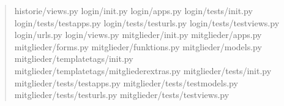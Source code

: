 \documentclass[letterpaper,10pt,english]{sphinxmanual}
\begin{document}
\begin{quote}
\begin{sphinxVerbatim}[commandchars=\\\{\}]
historie/views.py                                                    \PYGZpc{}
login/\PYGZus{}\PYGZus{}init\PYGZus{}\PYGZus{}.py                                                      \PYGZpc{}
login/apps.py                                                          \PYGZpc{}
login/tests/\PYGZus{}\PYGZus{}init\PYGZus{}\PYGZus{}.py                                                \PYGZpc{}
login/tests/test\PYGZus{}apps.py                                               \PYGZpc{}
login/tests/test\PYGZus{}urls.py                                              \PYGZpc{}
login/tests/test\PYGZus{}views.py                                             \PYGZpc{}
login/urls.py                                                          \PYGZpc{}
login/views.py                                                         \PYGZpc{}
mitglieder/\PYGZus{}\PYGZus{}init\PYGZus{}\PYGZus{}.py                                                 \PYGZpc{}
mitglieder/apps.py                                                     \PYGZpc{}
mitglieder/forms.py                                                   \PYGZpc{}
mitglieder/funktions.py                                                \PYGZpc{}
mitglieder/models.py                                                  \PYGZpc{}
mitglieder/templatetags/\PYGZus{}\PYGZus{}init\PYGZus{}\PYGZus{}.py                                    \PYGZpc{}
mitglieder/templatetags/mitglieder\PYGZus{}extras.py                            \PYGZpc{}
mitglieder/tests/\PYGZus{}\PYGZus{}init\PYGZus{}\PYGZus{}.py                                           \PYGZpc{}
mitglieder/tests/test\PYGZus{}apps.py                                          \PYGZpc{}
mitglieder/tests/test\PYGZus{}models.py                                       \PYGZpc{}
mitglieder/tests/test\PYGZus{}urls.py                                         \PYGZpc{}
mitglieder/tests/test\PYGZus{}views.py                                        \PYGZpc{}

\end{sphinxVerbatim}
\end{quote}
\end{document}
